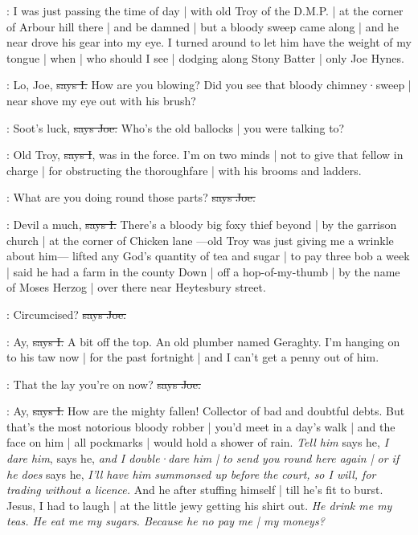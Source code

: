 \Nq:
I was just passing the time of day |
with old Troy of the D.M.P. |
at the corner of Arbour hill there |
and be damned |
but a bloody sweep came along |
and he near drove his gear into my eye.
I turned around
to let him have the weight of my tongue |
when |
who should I see |
dodging along Stony Batter |
only Joe Hynes.

:
Lo,
Joe,
\sout{says I.}
How are you blowing?
Did you see that bloody chimney·sweep |
near shove my eye out with his brush?

\joe:
Soot's luck,
\sout{says Joe.}
Who's the old ballocks |
you were talking to?

:
Old Troy,
\sout{says I},
was in the force.
I'm on two minds |
not to give that fellow in charge |
for obstructing the thoroughfare
 |
with his brooms and ladders.

\joe:
What are you doing round those parts?
\sout{says Joe.}

:
Devil a much,
\sout{says I.}
There's a bloody big foxy thief beyond |
by the garrison church |
at the corner of Chicken lane%
—old Troy was just giving me a wrinkle about him—%
lifted any God's quantity of tea and sugar |
to pay three bob a week |
said he had a farm in the county Down |
off a hop-of-my-thumb |
by the name of Moses Herzog |
over there near Heytesbury street.

\joe:
Circumcised?
\sout{says Joe.}

:
Ay,
\sout{says I.}
A bit off the top.
An old plumber named Geraghty.
I'm hanging on to his taw now |
for the past fortnight |
and I can't get a penny out of him.

\joe:
That the lay you're on now?
\sout{says Joe.}

:
Ay,
\sout{says I.}
How are the mighty fallen!
Collector of bad and doubtful debts.
But that's the most notorious bloody robber |
you'd meet in a day's walk |
and the face on him |
all pockmarks |
would hold a shower of rain.
\emph{Tell him}
says he,
\emph{I dare him},
says he,
\emph{and I double·dare him |
to send you round here again |
or if he does}
says he,
\emph{I'll have him summonsed up before the court,
so I will,
for trading without a licence.}
And he after stuffing himself |
till he's fit to burst.
Jesus,
I had to laugh |
at the little jewy getting his shirt out.
\emph{He drink me my teas.
He eat me my sugars.
Because he no pay me |
my moneys?}

